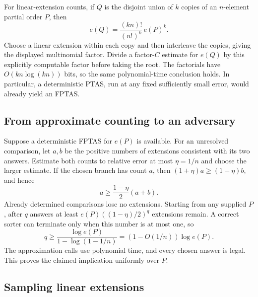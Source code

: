 For linear-extension counts, if $Q$ is the disjoint union of $k$ copies
of an $n$-element partial order $P$, then
\[
e(Q)=\frac{(kn)!}{(n!)^k}\,e(P)^k.
\]
Choose a linear extension within each copy and then interleave the
copies, giving the displayed multinomial factor. Divide a factor-$C$
estimate for $e(Q)$ by this explicitly computable factor before taking
the root. The factorials have $O(kn\log(kn))$ bits, so the same
polynomial-time conclusion holds. In particular, a deterministic PTAS,
run at any fixed sufficiently small error, would already yield an
FPTAS.

\subsection{From approximate counting to an adversary}
\label{app:counting-adversary}

Suppose a deterministic FPTAS for $e(P)$ is available. For an unresolved
comparison, let $a,b$ be the positive numbers of extensions consistent
with its two answers. Estimate both counts to relative error at most
$\eta=1/n$ and choose the larger estimate. If the chosen branch has
count $a$, then $(1+\eta)a\ge(1-\eta)b$, and hence
\[
a\ge\frac{1-\eta}{2}(a+b).
\]
Already determined comparisons lose no extensions. Starting from any
supplied $P$, after $q$ answers at least
$e(P)((1-\eta)/2)^q$ extensions remain. A correct sorter can terminate
only when this number is at most one, so
\[
q\ge\frac{\log e(P)}{1-\log(1-1/n)}
  =(1-O(1/n))\log e(P).
\]
The approximation calls use polynomial time, and every chosen answer
is legal. This proves the claimed implication uniformly over $P$.

\subsection{Sampling linear extensions}\label{app:exact-sampling}

